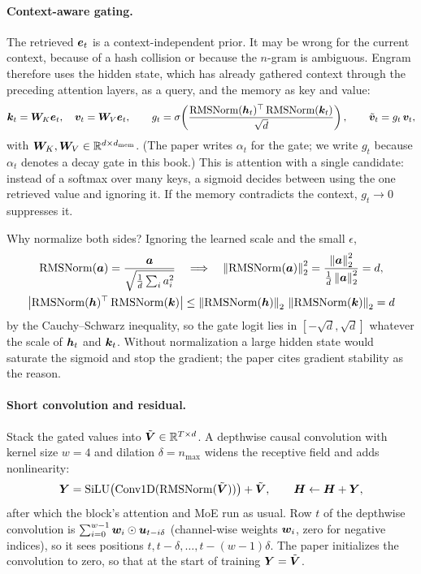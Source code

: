 \paragraph{Context-aware gating.} The retrieved $\bm{e}_t$ is a context-independent prior. It may be
wrong for the current context, because of a hash collision or because the $n$-gram is ambiguous.
Engram therefore uses the hidden state, which has already gathered context through the preceding
attention layers, as a query, and the memory as key and value:
\begin{equation}
  \bm{k}_t = \bm{W}_K \bm{e}_t,\quad \bm{v}_t = \bm{W}_V \bm{e}_t,\qquad
  g_t = \sigma\!\left(\frac{\operatorname{RMSNorm}(\bm{h}_t)^{\top} \operatorname{RMSNorm}(\bm{k}_t)}{\sqrt{d}}\right),\qquad
  \tilde{\bm{v}}_t = g_t\, \bm{v}_t ,
  \label{eq:c10-engram-gate}
\end{equation}
with $\bm{W}_K, \bm{W}_V \in \mathbb{R}^{d \times d_{\mathrm{mem}}}$. (The paper writes $\alpha_t$ for the gate; we
write $g_t$ because $\alpha_t$ denotes a decay gate in this book.) This is attention with a single
candidate: instead of a softmax over many keys, a sigmoid decides between using the one retrieved
value and ignoring it. If the memory contradicts the context, $g_t \to 0$ suppresses it.

Why normalize both sides? Ignoring the learned scale and the small $\epsilon$,
\begin{gather*}
  \operatorname{RMSNorm}(\bm{a}) = \frac{\bm{a}}{\sqrt{\tfrac1d\sum_i a_i^2}}
  \quad\Longrightarrow\quad \left\lVert \operatorname{RMSNorm}(\bm{a})\right\rVert_2^2 = \frac{\left\lVert \bm{a}\right\rVert_2^2}{\tfrac1d\left\lVert \bm{a}\right\rVert_2^2} = d,\\
  \left\lvert \operatorname{RMSNorm}(\bm{h})^{\top}\operatorname{RMSNorm}(\bm{k})\right\rvert \le \left\lVert \operatorname{RMSNorm}(\bm{h})\right\rVert_2\,\left\lVert \operatorname{RMSNorm}(\bm{k})\right\rVert_2 = d
\end{gather*}
by the Cauchy--Schwarz inequality, so the gate logit lies in $[-\sqrt{d}, \sqrt{d}]$ whatever the
scale of $\bm{h}_t$ and $\bm{k}_t$. Without normalization a
large hidden state would saturate the sigmoid and stop the gradient; the paper cites gradient
stability as the reason.

\paragraph{Short convolution and residual.} Stack the gated values into
$\tilde{\bm{V}} \in \mathbb{R}^{T \times d}$. A depthwise causal convolution with kernel size $w = 4$ and
dilation $\delta = n_{\max}$ widens the receptive field and adds nonlinearity:
\begin{equation}
  \bm{Y} = \operatorname{SiLU}\bigl(\mathrm{Conv1D}(\operatorname{RMSNorm}(\tilde{\bm{V}}))\bigr) + \tilde{\bm{V}},\qquad
  \bm{H} \gets \bm{H} + \bm{Y} ,
  \label{eq:c10-engram-conv}
\end{equation}
after which the block's attention and MoE run as usual. Row $t$ of the depthwise convolution is
$\sum_{i=0}^{w-1} \bm{w}_i \odot \bm{u}_{t - i\delta}$ (channel-wise weights $\bm{w}_i$, zero for negative
indices), so it sees positions $t, t-\delta, \dots, t-(w-1)\delta$. The paper initializes the
convolution to zero, so that at the start of training $\bm{Y} = \tilde{\bm{V}}$.

